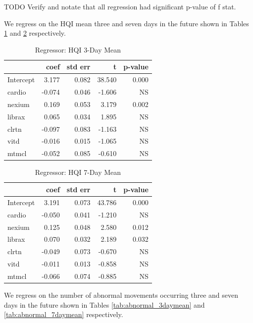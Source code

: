 \documentclass[conference]{IEEEtran}
\begin{document}
TODO Verify and notate that all regression had significant p-value of f stat.

We regress on the HQI mean three and seven days in the future shown in Tables \ref{tab:hqi_3daymean} and \ref{tab:hqi_7daymean} respectively.

\begin{table}
\begin{center}
\caption {Regressor: HQI 3-Day Mean} \label{tab:hqi_3daymean}
    \begin{tabular}{ | l | r | r | r | r |}
    \hline
     & coef & std err & t & p-value \\ \hline
Intercept & 3.177 & 0.082 & 38.540 & 0.000 \\
cardio & -0.074 & 0.046 & -1.606 & NS \\
nexium & 0.169 & 0.053 & 3.179 & 0.002 \\
librax & 0.065 & 0.034 & 1.895 & NS \\
clrtn & -0.097 & 0.083 & -1.163 & NS \\
vitd & -0.016 & 0.015 & -1.065 & NS \\
mtmcl & -0.052 & 0.085 & -0.610 & NS \\
    \hline
\end{tabular}
\end{center}
    \end{table}

\begin{table}
\begin{center}
\caption {Regressor: HQI 7-Day Mean} \label{tab:hqi_7daymean}
    \begin{tabular}{ | l | r | r | r | r |}
    \hline
     & coef & std err & t & p-value \\ \hline
Intercept & 3.191 & 0.073 & 43.786 & 0.000 \\
cardio & -0.050 & 0.041 & -1.210 & NS \\
nexium & 0.125 & 0.048 & 2.580 & 0.012 \\
librax & 0.070 & 0.032 & 2.189 & 0.032 \\
clrtn & -0.049 & 0.073 & -0.670 & NS \\
vitd & -0.011 & 0.013 & -0.858 & NS \\
mtmcl & -0.066 & 0.074 & -0.885 & NS \\
    \hline
    \end{tabular}
\end{center}
\end{table}

We regress on the number of abnormal movements occurring three and seven days in the future shown in Tables \ref{tab:abnormal_3daymean} and \ref{tab:abnormal_7daymean} respectively.
\end{document}
